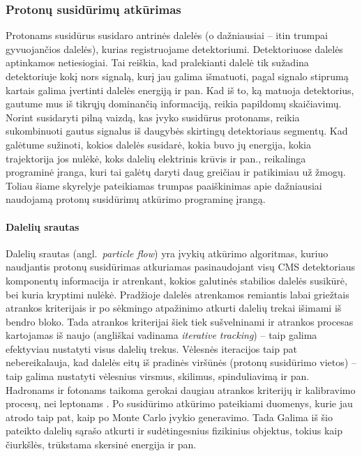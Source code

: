 \documentclass[a4paper, 12pt]{article}
\begin{document}
\subsubsection{Protonų susidūrimų atkūrimas}\label{sec:ppReco}

Protonams susidūrus susidaro antrinės dalelės (o dažniausiai -- itin trumpai gyvuojančios dalelės), kurias registruojame detektoriumi. Detektoriuose dalelės aptinkamos netiesiogiai. Tai reiškia, kad pralekianti dalelė tik sužadina detektoriuje kokį nors signalą, kurį jau galima išmatuoti, pagal signalo stiprumą kartais galima įvertinti dalelės energiją ir pan. Kad iš to, ką matuoja detektorius, gautume mus iš tikrųjų dominančią informaciją, reikia papildomų skaičiavimų. Norint susidaryti pilną vaizdą, kas įvyko susidūrus protonams, reikia sukombinuoti gautus signalus iš daugybės skirtingų detektoriaus segmentų. Kad galėtume sužinoti, kokios dalelės susidarė, kokia buvo jų energija, kokia trajektorija jos nulėkė, koks dalelių elektrinis krūvis ir pan., reikalinga programinė įranga, kuri tai galėtų daryti daug greičiau ir patikimiau už žmogų. Toliau šiame skyrelyje pateikiamas trumpas paaiškinimas apie dažniausiai naudojamą protonų susidūrimų atkūrimo programinę įrangą.

\paragraph{Dalelių srautas\\}
Dalelių srautas (angl.\ \textit{particle flow}) yra įvykių atkūrimo algoritmas, kuriuo naudjantis protonų susidūrimas atkuriamas pasinaudojant visų CMS detektoriaus komponentų informacija ir atrenkant, kokios galutinės stabilios dalelės susikūrė, bei kuria kryptimi nulėkė. Pradžioje dalelės atrenkamos remiantis labai griežtais atrankos kriterijais ir po sėkmingo atpažinimo atkurti dalelių trekai išimami iš bendro bloko. Tada atrankos kriterijai šiek tiek sušvelninami ir atrankos procesas kartojamas iš naujo (angliškai vadinama \textit{iterative tracking}) -- taip galima efektyviau nustatyti visus dalelių trekus. Vėlesnės iteracijos taip pat nebereikalauja, kad dalelės eitų iš pradinės viršūnės (protonų susidūrimo vietos) -- taip galima nustatyti vėlesnius virsmus, skilimus, spinduliavimą ir pan. Hadronams ir fotonams taikoma gerokai daugiau atrankos kriterijų ir kalibravimo procesų, nei leptonams \cite{pflowpdf}. Po susidūrimo atkūrimo pateikiami duomenys, kurie jau atrodo taip pat, kaip po Monte Carlo įvykio generavimo. Tada Galima iš šio pateikto dalelių sąrašo atkurti ir sudėtingesnius fizikinius objektus, tokius kaip čiurkšlės, trūkstama skersinė energija ir pan.
\end{document}
